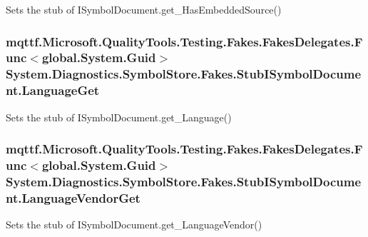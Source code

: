 Sets the stub of I\-Symbol\-Document.\-get\-\_\-\-Has\-Embedded\-Source()

\hypertarget{class_system_1_1_diagnostics_1_1_symbol_store_1_1_fakes_1_1_stub_i_symbol_document_af247a6c072ca8d17a922b35ecab88912}{
\subsubsection[{Language\-Get}]{\setlength{\rightskip}{0pt plus 5cm}mqttf.\-Microsoft.\-Quality\-Tools.\-Testing.\-Fakes.\-Fakes\-Delegates.\-Func$<$global.\-System.\-Guid$>$ System.\-Diagnostics.\-Symbol\-Store.\-Fakes.\-Stub\-I\-Symbol\-Document.\-Language\-Get}}\label{class_system_1_1_diagnostics_1_1_symbol_store_1_1_fakes_1_1_stub_i_symbol_document_af247a6c072ca8d17a922b35ecab88912}


Sets the stub of I\-Symbol\-Document.\-get\-\_\-\-Language()

\hypertarget{class_system_1_1_diagnostics_1_1_symbol_store_1_1_fakes_1_1_stub_i_symbol_document_a924d91e07f09d148a2ed6d4e7fa42e92}{
\subsubsection[{Language\-Vendor\-Get}]{\setlength{\rightskip}{0pt plus 5cm}mqttf.\-Microsoft.\-Quality\-Tools.\-Testing.\-Fakes.\-Fakes\-Delegates.\-Func$<$global.\-System.\-Guid$>$ System.\-Diagnostics.\-Symbol\-Store.\-Fakes.\-Stub\-I\-Symbol\-Document.\-Language\-Vendor\-Get}}\label{class_system_1_1_diagnostics_1_1_symbol_store_1_1_fakes_1_1_stub_i_symbol_document_a924d91e07f09d148a2ed6d4e7fa42e92}


Sets the stub of I\-Symbol\-Document.\-get\-\_\-\-Language\-Vendor()

